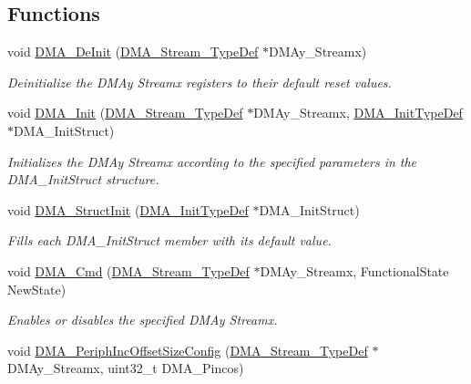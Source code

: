 \subsection*{Functions}
\begin{DoxyCompactItemize}
\item 
void \hyperlink{group___d_m_a_ga38d4a4ab8990299f8a6cf064e1e811d0}{D\+M\+A\+\_\+\+De\+Init} (\hyperlink{struct_d_m_a___stream___type_def}{D\+M\+A\+\_\+\+Stream\+\_\+\+Type\+Def} $\ast$D\+M\+Ay\+\_\+\+Streamx)
\begin{DoxyCompactList}\small\item\em Deinitialize the D\+M\+Ay Streamx registers to their default reset values. \end{DoxyCompactList}\item 
void \hyperlink{group___d_m_a_gaced8a4149acfb0a50b50e63273a87148}{D\+M\+A\+\_\+\+Init} (\hyperlink{struct_d_m_a___stream___type_def}{D\+M\+A\+\_\+\+Stream\+\_\+\+Type\+Def} $\ast$D\+M\+Ay\+\_\+\+Streamx, \hyperlink{struct_d_m_a___init_type_def}{D\+M\+A\+\_\+\+Init\+Type\+Def} $\ast$D\+M\+A\+\_\+\+Init\+Struct)
\begin{DoxyCompactList}\small\item\em Initializes the D\+M\+Ay Streamx according to the specified parameters in the D\+M\+A\+\_\+\+Init\+Struct structure. \end{DoxyCompactList}\item 
void \hyperlink{group___d_m_a_ga0f7f95f750a90a6824f4e9b6f58adc7e}{D\+M\+A\+\_\+\+Struct\+Init} (\hyperlink{struct_d_m_a___init_type_def}{D\+M\+A\+\_\+\+Init\+Type\+Def} $\ast$D\+M\+A\+\_\+\+Init\+Struct)
\begin{DoxyCompactList}\small\item\em Fills each D\+M\+A\+\_\+\+Init\+Struct member with its default value. \end{DoxyCompactList}\item 
void \hyperlink{group___d_m_a_gab2bea22f9f6dc62fdd7afb385a0c1f73}{D\+M\+A\+\_\+\+Cmd} (\hyperlink{struct_d_m_a___stream___type_def}{D\+M\+A\+\_\+\+Stream\+\_\+\+Type\+Def} $\ast$D\+M\+Ay\+\_\+\+Streamx, Functional\+State New\+State)
\begin{DoxyCompactList}\small\item\em Enables or disables the specified D\+M\+Ay Streamx. \end{DoxyCompactList}\item 
void \hyperlink{group___d_m_a_ga210a9861460b3c9b3fa14fdc1a949744}{D\+M\+A\+\_\+\+Periph\+Inc\+Offset\+Size\+Config} (\hyperlink{struct_d_m_a___stream___type_def}{D\+M\+A\+\_\+\+Stream\+\_\+\+Type\+Def} $\ast$D\+M\+Ay\+\_\+\+Streamx, uint32\+\_\+t D\+M\+A\+\_\+\+Pincos)

\end{DoxyCompactItemize}
